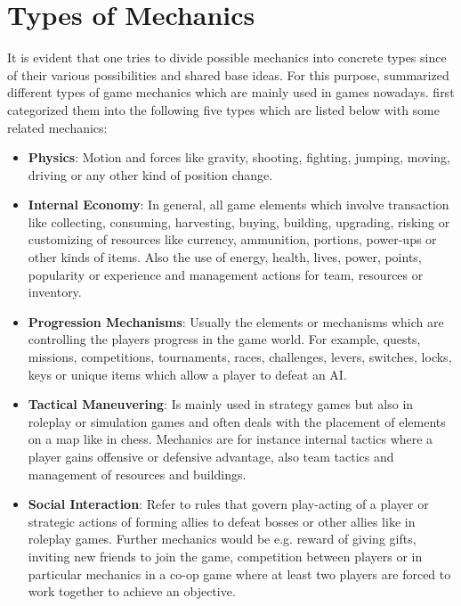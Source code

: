 \documentclass[MGS,Master,english]{twbook}%
\begin{document}
\section{Types of Mechanics}
It is evident that one tries to divide possible mechanics into concrete types since of their various possibilities and shared base ideas. For this purpose, \cite{gameDesign::gameMechanicsAdvancedGameDesign} summarized different types of game mechanics which are mainly used in games nowadays. \cite{gameDesign::gameMechanicsAdvancedGameDesign} first categorized them into the following five types which are listed below with some related mechanics:
\begin{itemize}
	\item \textbf{Physics}: Motion and forces like gravity, shooting, fighting, jumping, moving, driving or any other kind of position change. \cite{gameDesign::gameMechanicsAdvancedGameDesign}
	\item \textbf{Internal Economy}: In general, all game elements which involve transaction like collecting, consuming, harvesting, buying, building, upgrading, risking or customizing of resources like currency, ammunition, portions, power-ups or other kinds of items. Also the use of energy, health, lives, power, points, popularity or experience and management actions for team, resources or inventory. \cite{gameDesign::gameMechanicsAdvancedGameDesign}
	\item \textbf{Progression Mechanisms}: Usually the elements or mechanisms which are controlling the players progress in the game world. For example, quests, missions, competitions, tournaments, races, challenges, levers, switches, locks, keys or unique items which allow a player to defeat an AI. \cite{gameDesign::gameMechanicsAdvancedGameDesign}
	\item \textbf{Tactical Maneuvering}: Is mainly used in strategy games but also in roleplay or simulation games and often deals with the placement of elements on a map like in chess. Mechanics are for instance internal tactics where a player gains offensive or defensive advantage, also team tactics and management of resources and buildings. \cite{gameDesign::gameMechanicsAdvancedGameDesign}
	\item \textbf{Social Interaction}: Refer to rules that govern play-acting of a player or strategic actions of forming allies to defeat bosses or other allies like in roleplay games. Further mechanics would be e.g. reward of giving gifts, inviting new friends to join the game, competition between players or in particular mechanics in a co-op game where at least two players are forced to work together to achieve an objective. \cite{gameDesign::gameMechanicsAdvancedGameDesign}
\end{itemize}
\end{document}
